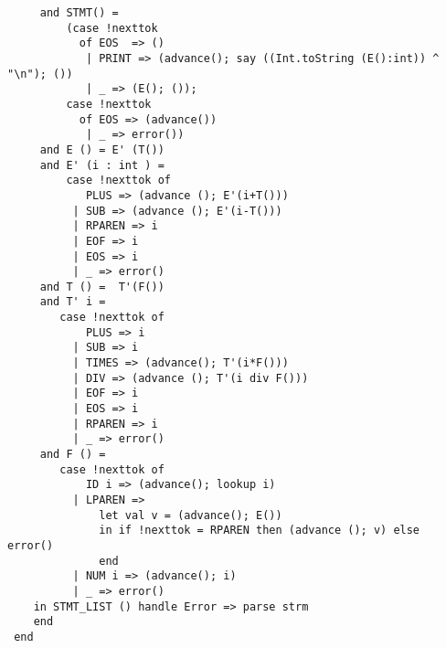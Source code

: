 \documentclass{article}
\begin{document}
\begin{verbatim}
     and STMT() =
         (case !nexttok
           of EOS  => ()
            | PRINT => (advance(); say ((Int.toString (E():int)) ^ "\n"); ())
            | _ => (E(); ());
         case !nexttok
           of EOS => (advance())
            | _ => error())
     and E () = E' (T())
     and E' (i : int ) =
         case !nexttok of
            PLUS => (advance (); E'(i+T()))
          | SUB => (advance (); E'(i-T()))
          | RPAREN => i
          | EOF => i
          | EOS => i
          | _ => error()
     and T () =  T'(F())
     and T' i =
        case !nexttok of
            PLUS => i
          | SUB => i
          | TIMES => (advance(); T'(i*F()))
          | DIV => (advance (); T'(i div F()))
          | EOF => i
          | EOS => i
          | RPAREN => i
          | _ => error()
     and F () =
        case !nexttok of
            ID i => (advance(); lookup i)
          | LPAREN =>
              let val v = (advance(); E())
              in if !nexttok = RPAREN then (advance (); v) else error()
              end
          | NUM i => (advance(); i)
          | _ => error()
    in STMT_LIST () handle Error => parse strm
    end
 end
\end{verbatim}
\end{document}
